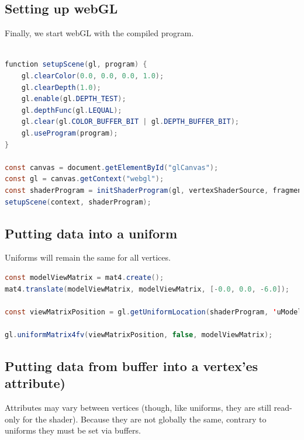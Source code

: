 \subsection{Setting up webGL}

Finally, we start webGL with the compiled program.
\begin{lstlisting}[language=java]

function setupScene(gl, program) {
    gl.clearColor(0.0, 0.0, 0.0, 1.0);
    gl.clearDepth(1.0);
    gl.enable(gl.DEPTH_TEST);
    gl.depthFunc(gl.LEQUAL);
    gl.clear(gl.COLOR_BUFFER_BIT | gl.DEPTH_BUFFER_BIT);
    gl.useProgram(program);
}

const canvas = document.getElementById("glCanvas");
const gl = canvas.getContext("webgl");
const shaderProgram = initShaderProgram(gl, vertexShaderSource, fragmentShaderSource);
setupScene(context, shaderProgram);
\end{lstlisting}

\subsection{Putting data into a uniform}

Uniforms will remain the same for all vertices. 

\begin{lstlisting}[language=java]
const modelViewMatrix = mat4.create();
mat4.translate(modelViewMatrix, modelViewMatrix, [-0.0, 0.0, -6.0]);

const viewMatrixPosition = gl.getUniformLocation(shaderProgram, 'uModelViewMatrix');

gl.uniformMatrix4fv(viewMatrixPosition, false, modelViewMatrix);
\end{lstlisting}

\subsection{Putting data from buffer into a vertex'es attribute)}

Attributes may vary between vertices (though, like uniforms, they are still read-only for the shader). Because they are not globally the same, contrary to uniforms they must be set via buffers. 

